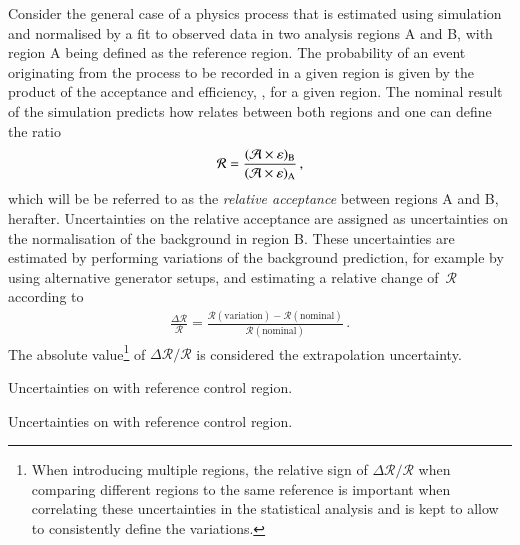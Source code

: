 Consider the general case of a physics process that is estimated using
simulation and normalised by a fit to observed data in two analysis
regions A and B, with region A being defined as the reference
region. The probability of an event originating from the process to be
recorded in a given region is given by the product of the acceptance
and efficiency, \AccTimesEff, for a given region. The nominal result
of the simulation predicts how \AccTimesEff relates between both
regions and one can define the ratio
\begin{align*}
  \mathcal{R} = \frac{(\mathcal{A} \times \varepsilon)_{\text{B}}}{(\mathcal{A} \times \varepsilon)_{\text{A}}} \,\text{,}
\end{align*}
which will be be referred to as the \emph{relative acceptance} between
regions A and B, herafter. Uncertainties on the relative acceptance
are assigned as uncertainties on the normalisation of the background
in region B. These
uncertainties are estimated by performing variations of the background
prediction, for example by using alternative generator setups, and
estimating a relative change of~$\mathcal{R}$ according to
\begin{align*}
  \frac{\Delta \mathcal{R}}{\mathcal{R}} = \frac{\mathcal{R}(\text{variation}) - \mathcal{R}(\text{nominal})}{\mathcal{R}(\text{nominal})} \,\text{.}
\end{align*}
The absolute value\footnote{When introducing multiple regions, the
  relative sign of $\Delta \mathcal{R} / \mathcal{R}$ when comparing
  different regions to the same reference is important when
  correlating these uncertainties in the statistical analysis and is
  kept to allow to consistently define the variations.} of
$\Delta \mathcal{R} / \mathcal{R}$ is considered the extrapolation
uncertainty.




\begin{table}[htbp]
  \centering

  

  \caption{Uncertainties on \ttbar with reference \ZHF control region.}
  \label{tab:uncertainties_ttbar_extrapol}
\end{table}

\begin{table}[htbp]
  \centering

  

  \caption{Uncertainties on \ZHF with reference \ZHF control region.}
  \label{tab:uncertainties_zhf_extrapol}
\end{table}


